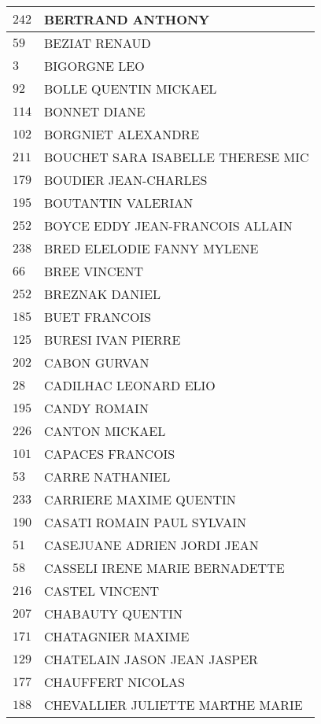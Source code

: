 \begin{xltabular}{\linewidth}{|l|X|}
    $242$ & BERTRAND ANTHONY \\
    \hline
    $59$ & BEZIAT RENAUD \\
    \hline
    $3$ & BIGORGNE LEO \\
    \hline
    $92$ & BOLLE QUENTIN MICKAEL \\
    \hline
    $114$ & BONNET DIANE \\
    \hline
    $102$ & BORGNIET ALEXANDRE \\
    \hline
    $211$ & BOUCHET SARA ISABELLE THERESE MIC \\
    \hline
    $179$ & BOUDIER JEAN-CHARLES \\
    \hline
    $195$ & BOUTANTIN VALERIAN \\
    \hline
    $252$ & BOYCE EDDY JEAN-FRANCOIS ALLAIN \\
    \hline
    $238$ & BRED ELELODIE FANNY MYLENE \\
    \hline
    $66$ & BREE VINCENT \\
    \hline
    $252$ & BREZNAK DANIEL \\
    \hline
    $185$ & BUET FRANCOIS \\
    \hline
    $125$ & BURESI IVAN PIERRE \\
    \hline
    $202$ & CABON GURVAN \\
    \hline
    $28$ & CADILHAC LEONARD ELIO \\
    \hline
    $195$ & CANDY ROMAIN \\
    \hline
    $226$ & CANTON MICKAEL \\
    \hline
    $101$ & CAPACES FRANCOIS \\
    \hline
    $53$ & CARRE NATHANIEL \\
    \hline
    $233$ & CARRIERE MAXIME QUENTIN \\
    \hline
    $190$ & CASATI ROMAIN PAUL SYLVAIN \\
    \hline
    $51$ & CASEJUANE ADRIEN JORDI JEAN \\
    \hline
    $58$ & CASSELI IRENE MARIE BERNADETTE \\
    \hline
    $216$ & CASTEL VINCENT \\
    \hline
    $207$ & CHABAUTY QUENTIN \\
    \hline
    $171$ & CHATAGNIER MAXIME \\
    \hline
    $129$ & CHATELAIN JASON JEAN JASPER \\
    \hline
    $177$ & CHAUFFERT NICOLAS \\
    \hline
    $188$ & CHEVALLIER JULIETTE MARTHE MARIE \\

\end{xltabular}
